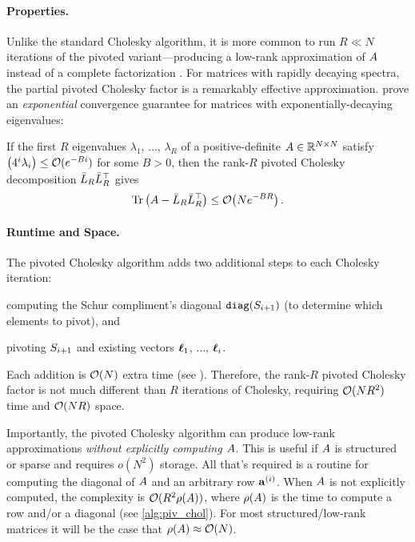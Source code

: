 \paragraph{Properties.}
Unlike the standard Cholesky algorithm, it is more common to run $R \ll N$ iterations of the pivoted variant---producing a low-rank approximation of $A$ instead of a complete factorization \cite{harbrecht2012low}.
For matrices with rapidly decaying spectra, the partial pivoted Cholesky factor is a remarkably effective approximation.
\citet{harbrecht2012low} prove an \emph{exponential} convergence guarantee for matrices with exponentially-decaying eigenvalues:
%
\begin{theorem}
\label{thm:harbrecht}
  If the first $R$ eigenvalues $\lambda_1$, $\ldots$, $\lambda_R$ of a positive-definite $A \in \mathbb{R}^{N \times N}$ satisfy $\left( 4^{i}\lambda_{i} \right) \leq \bigo{e^{-Bi}}$ for some $B>0$,
  then the rank-$R$ pivoted Cholesky decomposition $\bar{L}_{R} \bar{L}_R^\top$ gives
  \[
    \tr{\bA -  \bar\bL_R \bar\bL_R^\top} \leq \bigo{N e^{-BR}}.
  \]
\end{theorem}


\paragraph{Runtime and Space.}
The pivoted Cholesky algorithm adds two additional steps to each Cholesky iteration:
%
\begin{enumerate*}
  \item computing the Schur compliment's diagonal $\texttt{diag}(S_{i+1})$ (to determine which elements to pivot), and
  \item pivoting $S_{i+1}$ and existing vectors $\boldsymbol{\ell}_1$, $\ldots$, $\boldsymbol{\ell}_i$.
\end{enumerate*}
%
Each addition is $\bigo{N}$ extra time (see \citep[][Thm. 1]{harbrecht2012low}).
Therefore, the rank-$R$ pivoted Cholesky factor is not much different than $R$ iterations of Cholesky, requiring $\bigo{N R^2}$ time and $\bigo{NR}$ space.

Importantly, the pivoted Cholesky algorithm can produce low-rank approximations \emph{without explicitly computing $A$}.
This is useful if $A$ is structured or sparse and requires $o(N^2)$ storage.
All that's required is a routine for computing the diagonal of $A$ and an arbitrary row $\mathbf{a}^{(i)}$.
When $A$ is not explicitly computed, the complexity is $\bigo{R^2 \row{\bA}}$, where $\rho ( A )$ is the time to compute a row and/or a diagonal (see \cref{alg:piv_chol}).
For most structured/low-rank matrices it will be the case that $\row{\bA} \approx \bigo{N}$.


